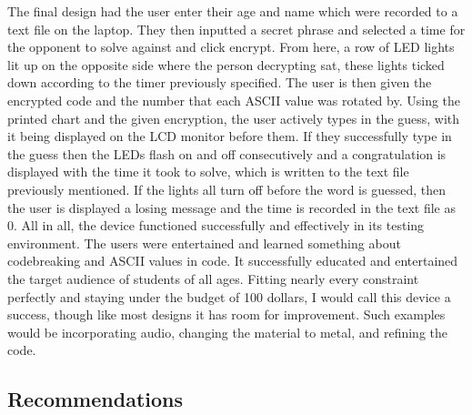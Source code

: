 \documentclass[conference]{IEEEtran}
\begin{document}
\par The final design had the user enter their age and name which were recorded to a text file on the laptop. They then inputted a secret phrase and selected a time for the opponent to solve against and click encrypt. From here, a row of LED lights lit up on the opposite side where the person decrypting sat, these lights ticked down according to the timer previously specified. The user is then given the encrypted code and the number that each ASCII value was rotated by. Using the printed chart and the given encryption, the user actively types in the guess, with it being displayed on the LCD monitor before them. If they successfully type in the guess then the LEDs flash on and off consecutively and a congratulation is displayed with the time it took to solve, which is written to the text file previously mentioned. If the lights all turn off before the word is guessed, then the user is displayed a losing message and the time is recorded in the text file as 0. All in all, the device functioned successfully and effectively in its testing environment. The users were entertained and learned something about codebreaking and ASCII values in code. It successfully educated and entertained the target audience of students of all ages. Fitting nearly every constraint perfectly and staying under the budget of 100 dollars, I would call this device a success, though like most designs it has room for improvement. Such examples would be incorporating audio, changing the material to metal, and refining the code.

\subsection{Recommendations}
\end{document}
